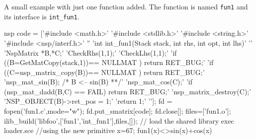 \begin{examples}
  A small example with just one function added. The function 
  is named \verb!fun1! and its interface is \verb!int_fun1!.
  \begin{mintednsp}{nsp}
    code = ['#include <math.h>'
            '#include <stdlib.h>'
            '#include <string.h>'
            '#include <nsp/interf.h>'
            ''
            'int int_fun1(Stack stack, int rhs, int opt, int lhs)'
            '{'
              'NspMatrix *B,*C;'
              'CheckRhs(1,1);'
              'CheckLhs(1,1);'
              'if ((B=GetMatCopy(stack,1))== NULLMAT ) return RET_BUG;'
              'if ((C=nsp_matrix_copy(B))== NULLMAT ) return RET_BUG;'
              'nsp_mat_sin(B); /* B <-- sin(B) **/'
              'nsp_mat_cos(C);'
              'if (nsp_mat_dadd(B,C) == FAIL) return RET_BUG;'
              'nsp_matrix_destroy(C);'
              'NSP_OBJECT(B)->ret_pos = 1;'
              'return 1;'
            '}'];
    fd = fopen('fun1.c',mode="w");
    fd.put_smatrix[code];
    fd.close[];
    files=['fun1.o'];
    ilib_build('libfoo',['fun1','int_fun1'],files,[]);
    // load the shared library 
    exec loader.sce 
    //using the new primitive 
    x=67;
    fun1(x)<>sin(x)+cos(x)
  \end{mintednsp}
\end{examples}
\begin{manseealso}
\end{manseealso}

